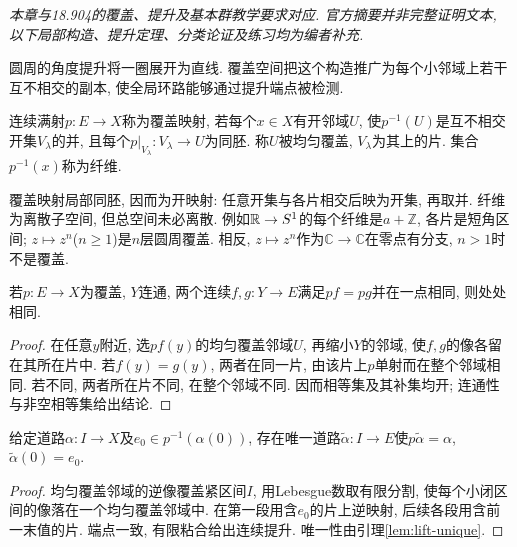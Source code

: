 \label{ch:coverings}
\emph{本章与18.904的覆盖、提升及基本群教学要求对应. 官方摘要并非完整证明文本, 以下局部构造、提升定理、分类论证及练习均为编者补充.}

圆周的角度提升将一圈展开为直线. 覆盖空间把这个构造推广为每个小邻域上若干互不相交的副本, 使全局环路能够通过提升端点被检测.
\begin{definition}
连续满射$p:E\to X$称为覆盖映射, 若每个$x\in X$有开邻域$U$, 使$p^{-1}(U)$是互不相交开集$V_\lambda$的并, 且每个$p|_{V_\lambda}:V_\lambda\to U$为同胚. 称$U$被均匀覆盖, $V_\lambda$为其上的片. 集合$p^{-1}(x)$称为纤维.
\end{definition}
覆盖映射局部同胚, 因而为开映射: 任意开集与各片相交后映为开集, 再取并. 纤维为离散子空间, 但总空间未必离散. 例如$\mathbb R\to S^1$的每个纤维是$a+\mathbb Z$, 各片是短角区间; $z\mapsto z^n$($n\ge1$)是$n$层圆周覆盖. 相反, $z\mapsto z^n$作为$\mathbb C\to\mathbb C$在零点有分支, $n>1$时不是覆盖.

\begin{lemma}\label{lem:lift-unique}
若$p:E\to X$为覆盖, $Y$连通, 两个连续$f,g:Y\to E$满足$pf=pg$并在一点相同, 则处处相同.
\end{lemma}
\begin{proof}
在任意$y$附近, 选$pf(y)$的均匀覆盖邻域$U$, 再缩小$Y$的邻域, 使$f,g$的像各留在其所在片中. 若$f(y)=g(y)$, 两者在同一片, 由该片上$p$单射而在整个邻域相同. 若不同, 两者所在片不同, 在整个邻域不同. 因而相等集及其补集均开; 连通性与非空相等集给出结论.
\end{proof}

\begin{theorem}\label{thm:cover-path-lift}
给定道路$\alpha:I\to X$及$e_0\in p^{-1}(\alpha(0))$, 存在唯一道路$\widetilde\alpha:I\to E$使$p\widetilde\alpha=\alpha$, $\widetilde\alpha(0)=e_0$.
\end{theorem}
\begin{proof}
均匀覆盖邻域的逆像覆盖紧区间$I$, 用Lebesgue数取有限分割, 使每个小闭区间的像落在一个均匀覆盖邻域中. 在第一段用含$e_0$的片上逆映射, 后续各段用含前一末值的片. 端点一致, 有限粘合给出连续提升. 唯一性由引理\ref{lem:lift-unique}.
\end{proof}

